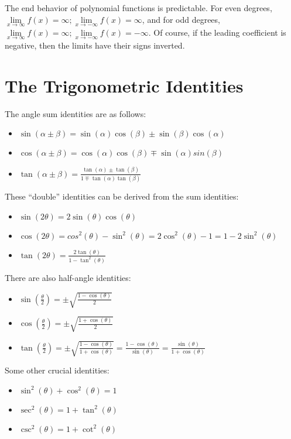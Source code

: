 \documentclass{report}
\begin{document}
The end behavior of polynomial functions is predictable. For even degrees, \(\underset{x\to\infty}{\lim}f(x)=\infty;\underset{x\to -\infty}{\lim}f(x)=\infty\), and for odd degrees, \(\underset{x\to\infty}{\lim}f(x)=\infty;\underset{x\to -\infty}{\lim}f(x)=-\infty\). Of course, if the leading coefficient is negative, then the limits have their signs inverted.
\section{The Trigonometric Identities}

\noindent The angle sum identities are as follows:
\begin{itemize}
    \item \(\sin(\alpha\pm\beta)=\sin(\alpha)\cos(\beta)\pm\sin(\beta)\cos(\alpha)\)
    \item \(\cos(\alpha\pm\beta)=\cos(\alpha)\cos(\beta)\mp\sin(\alpha)sin(\beta)\)
    \item \(\tan(\alpha\pm\beta)=\frac{\tan(\alpha)\pm\tan(\beta)}{1\mp\tan(\alpha)\tan(\beta)}\)
\end{itemize}

\noindent These ``double'' identities can be derived from the sum identities:
\begin{itemize}
    \item \(\sin(2\theta)=2\sin(\theta)\cos(\theta)\)
    \item \(\cos(2\theta)=cos^2(\theta)-\sin^2(\theta)=2\cos^2(\theta)-1=1-2\sin^2(\theta)\)
    \item \(\tan(2\theta)=\frac{2\tan(\theta)}{1-\tan^2(\theta)}\)
\end{itemize}

\noindent There are also half-angle identities:
\begin{itemize}
    \item \(\sin(\frac{\theta}{2})=\pm\sqrt{\frac{1-\cos(\theta)}{2}}\)
    \item \(\cos(\frac{\theta}{2})=\pm\sqrt{\frac{1+\cos(\theta)}{2}}\)
    \item \(\tan(\frac{\theta}{2})=\pm\sqrt{\frac{1-\cos(\theta)}{1+\cos(\theta)}}=\frac{1-\cos(\theta)}{\sin(\theta)}=\frac{\sin(\theta)}{1+\cos(\theta)}\)
\end{itemize}

\noindent Some other crucial identities:
\begin{itemize}
    \item \(\sin^2(\theta)+\cos^2(\theta)=1\)
    \item \(\sec^2(\theta)=1+\tan^2(\theta)\)
    \item \(\csc^2(\theta)=1+\cot^2(\theta)\)
\end{itemize}
\end{document}

